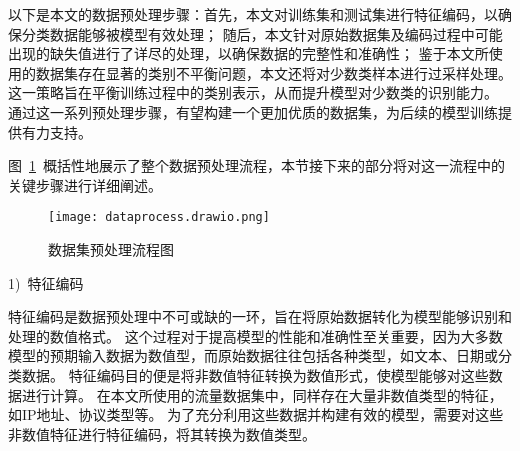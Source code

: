 以下是本文的数据预处理步骤：首先，本文对训练集和测试集进行特征编码，以确保分类数据能够被模型有效处理；
随后，本文针对原始数据集及编码过程中可能出现的缺失值进行了详尽的处理，以确保数据的完整性和准确性；
鉴于本文所使用的数据集存在显著的类别不平衡问题，本文还将对少数类样本进行过采样处理。
这一策略旨在平衡训练过程中的类别表示，从而提升模型对少数类的识别能力。
通过这一系列预处理步骤，有望构建一个更加优质的数据集，为后续的模型训练提供有力支持。\par

图~\ref{fig:dataprocess}~概括性地展示了整个数据预处理流程，本节接下来的部分将对这一流程中的关键步骤进行详细阐述。
\begin{figure}[htbp]
	\centering
	\texttt{[image: dataprocess.drawio.png]}
	\caption{数据集预处理流程图}
	\label{fig:dataprocess}
\end{figure}

1)~特征编码\par

特征编码是数据预处理中不可或缺的一环，旨在将原始数据转化为模型能够识别和处理的数值格式。
这个过程对于提高模型的性能和准确性至关重要，因为大多数模型的预期输入数据为数值型，而原始数据往往包括各种类型，如文本、日期或分类数据。
特征编码目的便是将非数值特征转换为数值形式，使模型能够对这些数据进行计算。
在本文所使用的流量数据集中，同样存在大量非数值类型的特征，如IP地址、协议类型等。
为了充分利用这些数据并构建有效的模型，需要对这些非数值特征进行特征编码，将其转换为数值类型。\par

